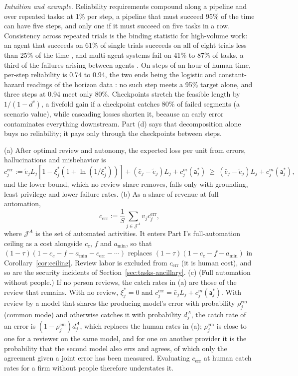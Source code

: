 \noindent\emph{Intuition and example.} Reliability requirements compound along a pipeline and over repeated tasks: at 1\% per step, a pipeline that must succeed 95\% of the time can have five steps, and only one if it must succeed on five tasks in a row. Consistency across repeated trials is the binding statistic for high-volume work: an agent that succeeds on 61\% of single trials succeeds on all of eight trials less than 25\% of the time \citep{yao2025tau}, and multi-agent systems fail on 41\% to 87\% of tasks, a third of the failures arising between agents \citep{cemri2025why}. On steps of an hour of human time, per-step reliability is 0.74 to 0.94, the two ends being the logistic and constant-hazard readings of the horizon data \citep{kwa2025measuring,ord2025is}: no such step meets a 95\% target alone, and three steps at 0.94 meet only 80\%. Checkpoints stretch the feasible length by $1/(1-d^c)$, a fivefold gain if a checkpoint catches 80\% of failed segments (a scenario value), while cascading losses shorten it, because an early error contaminates everything downstream. Part (d) says that decomposition alone buys no reliability; it pays only through the checkpoints between steps.

\begin{proposition}\label{prop:tasks-cerr}
(a) After optimal review and autonomy, the expected loss per unit from errors, hallucinations and misbehavior is
\[
c^{\mathrm{err}}_j:=\tilde e_jL_j[1-\xi^*_j(1+\ln(1/\xi^*_j))]+(\bar e_j-\tilde e_j)L_j+c^m_j(\mathsf a^*_j)\ \ge\ (\bar e_j-\tilde e_j)L_j+c^m_j(\mathsf a^*_j),
\]
and the lower bound, which no review share removes, falls only with grounding, least privilege and lower failure rates. (b) As a share of revenue at full automation,
\begin{equation}\label{eq:tasks-cerr}
c_{\mathrm{err}}:=\frac1S\sum_{j\in\mathcal J^A}v_jc^{\mathrm{err}}_j ,
\end{equation}
where $\mathcal J^A$ is the set of automated activities. It enters Part I's full-automation ceiling as a cost alongside $c_c$, $f$ and $a_{\min}$, so that $(1-\tau)(1-c_c-f-a_{\min}-c_{\mathrm{err}}-\cdots)$ replaces $(1-\tau)(1-c_c-f-a_{\min})$ in Corollary~\ref{cor:ceiling}. Review labor is excluded from $c_{\mathrm{err}}$ (it is human cost), and so are the security incidents of Section~\ref{sec:tasks-ancillary}. (c) (Full automation without people.) If no person reviews, the catch rates in (a) are those of the review that remains. With no review, $\xi^*_j=0$ and $c^{\mathrm{err}}_j=\bar e_jL_j+c^m_j(\mathsf a^*_j)$. With review by a model that shares the producing model's error with probability $\rho^{\mathrm{cm}}_j$ (common mode) and otherwise catches it with probability $d^A_j$, the catch rate of an error is $(1-\rho^{\mathrm{cm}}_j)d^A_j$, which replaces the human rates in (a); $\rho^{\mathrm{cm}}_j$ is close to one for a reviewer on the same model, and for one on another provider it is the probability that the second model also errs and agrees, of which only the agreement given a joint error has been measured. Evaluating $c_{\mathrm{err}}$ at human catch rates for a firm without people therefore understates it.
\end{proposition}

